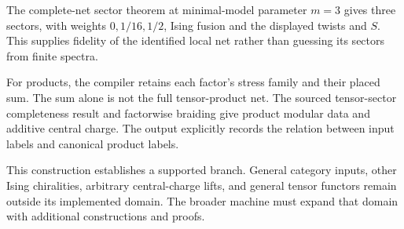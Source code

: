 The complete-net sector theorem at minimal-model parameter $m=3$ gives
three sectors, with weights $0,1/16,1/2$, Ising fusion and the displayed
twists and $S$. This supplies fidelity of the identified local net rather
than guessing its sectors from finite spectra.

For products, the compiler retains each factor's stress family and their
placed sum. The sum alone is not the full tensor-product net. The sourced
tensor-sector completeness result and factorwise braiding give product
modular data and additive central charge. The output explicitly records
the relation between input labels and canonical product labels.

This construction establishes a supported branch. General category inputs,
other Ising chiralities, arbitrary central-charge lifts, and general tensor
functors remain outside its implemented domain. The broader machine must
expand that domain with additional constructions and proofs.
